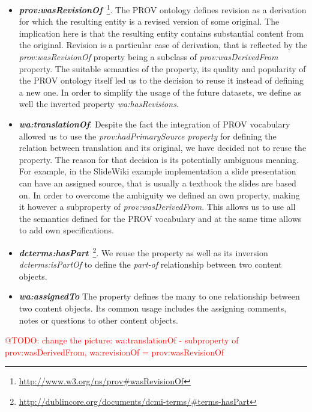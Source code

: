\documentclass[ngerman,UKenglish,table]{scrbook}
\makeatletter
\newcommand{\todo}[1]{\textcolor{red}{@TODO: #1}}
\makeatother
\begin{document}
\begin{itemize}
\item \textbf{\emph{prov:wasRevisionOf}}~\footnote{\url{http://www.w3.org/ns/prov\#wasRevisionOf}}.
The PROV ontology defines revision as a derivation for which the resulting entity is a revised version of some original.
The implication here is that the resulting entity contains substantial content from the original.
Revision is a particular case of derivation, that is reflected by the \emph{prov:wasRevisionOf} property being a subclass of \emph{prov:wasDerivedFrom} property.
The suitable semantics of the property, its quality and popularity of the PROV ontology itself led us to the decision to reuse it instead of defining a new one.
In order to simplify the usage of the future datasets, we define as well the inverted property \emph{wa:hasRevisions}.

\item \textbf{\emph{wa:translationOf}}. 
Despite the fact the integration of PROV vocabulary allowed us to use the \emph{prov:hadPrimarySource property} for defining the relation between translation and its original, we have decided not to reuse the property.
The reason for that decision is its potentially ambiguous meaning.
For example, in the SlideWiki example implementation a slide presentation can have an assigned source, that is usually a textbook the slides are based on.
In order to overcome the ambiguity we defined an own property, making it however a subproperty of \emph{prov:wasDerivedFrom}. 
This allows us to use all the semantics defined for the PROV vocabulary and at the same time allows to add own specifications.
\item \textbf{\emph{dcterms:hasPart}}~\footnote{\url{http://dublincore.org/documents/dcmi-terms/\#terms-hasPart}}.
We reuse the property as well as its inversion \emph{dcterms:isPartOf} to define the \emph{part-of} relationship between two content objects.

\item \textbf{\emph{wa:assignedTo}}
The property defines the many to one relationship between two content objects.
Its common usage includes the assigning comments, notes or questions to other content objects.
\end{itemize}
  
\todo{change the picture: wa:translationOf - subproperty of prov:wasDerivedFrom, wa:revisionOf = prov:wasRevisionOf}
 
\end{document}
